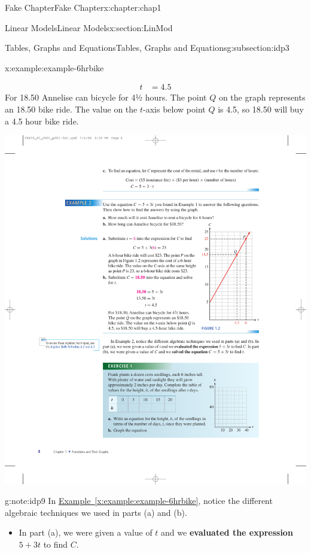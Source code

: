 \documentclass[oneside,10pt,]{book}
\newcommand{\xreffont}{\relax}
\newcommand{\terminology}[1]{\textbf{#1}}
\numberwithin{equation}{section}
\newcommand{\amp}{&}
\begin{document}
\begin{chapterptx}{Fake Chapter}{}{Fake Chapter}{}{}{x:chapter:chap1}
\begin{sectionptx}{Linear Models}{}{Linear Models}{}{}{x:section:LinMod}
\begin{subsectionptx}{Tables, Graphs and Equations}{}{Tables, Graphs and Equations}{}{}{g:subsection:idp3}
\begin{example}{}{x:example:example-6hrbike}
\begin{enumerate}[label=\alph*]
\begin{sidebyside}{2}{0.0125}{0.0125}{0.025}
\begin{sbspanel}{0.6}
\begin{align*}
t\amp=4.5
\end{align*}
For \textdollar{}18.50 Annelise can bicycle for 4½ hours. The point \(Q\) on the graph represents an \textdollar{}18.50 bike ride. The value on the \(t\)-axis below point \(Q\) is 4.5, so \textdollar{}18.50 will buy a 4.5 hour bike ride.%
\end{sbspanel}%
\begin{sbspanel}{0.35}%
\includegraphics[width=\linewidth]{external/photos/fig1-2.pdf}
\end{sbspanel}%
\end{sidebyside}%
%
\end{enumerate}
%
\end{example}
\begin{note}{}{g:note:idp9}%
In \hyperref[x:example:example-6hrbike]{Example~{\xreffont\ref{x:example:example-6hrbike}}}, notice the different algebraic techniques we used in parts (a) and (b).%
\par
%
\begin{itemize}[label=\textbullet]
\item{}In part (a), we were given a value of \(t\) and we \terminology{evaluated the expression}  \(5+3t\) to find \(C\).%

\end{itemize}
\end{note}
\end{subsectionptx}
\end{sectionptx}
\end{chapterptx}
\end{document}
